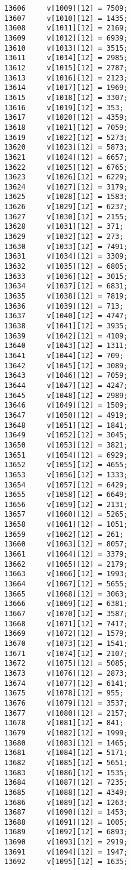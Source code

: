 \begin{Code}
\begin{verbatim}
13606     v[1009][12] = 7509;
13607     v[1010][12] = 1435;
13608     v[1011][12] = 2169;
13609     v[1012][12] = 6939;
13610     v[1013][12] = 3515;
13611     v[1014][12] = 2985;
13612     v[1015][12] = 2787;
13613     v[1016][12] = 2123;
13614     v[1017][12] = 1969;
13615     v[1018][12] = 3307;
13616     v[1019][12] = 353;
13617     v[1020][12] = 4359;
13618     v[1021][12] = 7059;
13619     v[1022][12] = 5273;
13620     v[1023][12] = 5873;
13621     v[1024][12] = 6657;
13622     v[1025][12] = 6765;
13623     v[1026][12] = 6229;
13624     v[1027][12] = 3179;
13625     v[1028][12] = 1583;
13626     v[1029][12] = 6237;
13627     v[1030][12] = 2155;
13628     v[1031][12] = 371;
13629     v[1032][12] = 273;
13630     v[1033][12] = 7491;
13631     v[1034][12] = 3309;
13632     v[1035][12] = 6805;
13633     v[1036][12] = 3015;
13634     v[1037][12] = 6831;
13635     v[1038][12] = 7819;
13636     v[1039][12] = 713;
13637     v[1040][12] = 4747;
13638     v[1041][12] = 3935;
13639     v[1042][12] = 4109;
13640     v[1043][12] = 1311;
13641     v[1044][12] = 709;
13642     v[1045][12] = 3089;
13643     v[1046][12] = 7059;
13644     v[1047][12] = 4247;
13645     v[1048][12] = 2989;
13646     v[1049][12] = 1509;
13647     v[1050][12] = 4919;
13648     v[1051][12] = 1841;
13649     v[1052][12] = 3045;
13650     v[1053][12] = 3821;
13651     v[1054][12] = 6929;
13652     v[1055][12] = 4655;
13653     v[1056][12] = 1333;
13654     v[1057][12] = 6429;
13655     v[1058][12] = 6649;
13656     v[1059][12] = 2131;
13657     v[1060][12] = 5265;
13658     v[1061][12] = 1051;
13659     v[1062][12] = 261;
13660     v[1063][12] = 8057;
13661     v[1064][12] = 3379;
13662     v[1065][12] = 2179;
13663     v[1066][12] = 1993;
13664     v[1067][12] = 5655;
13665     v[1068][12] = 3063;
13666     v[1069][12] = 6381;
13667     v[1070][12] = 3587;
13668     v[1071][12] = 7417;
13669     v[1072][12] = 1579;
13670     v[1073][12] = 1541;
13671     v[1074][12] = 2107;
13672     v[1075][12] = 5085;
13673     v[1076][12] = 2873;
13674     v[1077][12] = 6141;
13675     v[1078][12] = 955;
13676     v[1079][12] = 3537;
13677     v[1080][12] = 2157;
13678     v[1081][12] = 841;
13679     v[1082][12] = 1999;
13680     v[1083][12] = 1465;
13681     v[1084][12] = 5171;
13682     v[1085][12] = 5651;
13683     v[1086][12] = 1535;
13684     v[1087][12] = 7235;
13685     v[1088][12] = 4349;
13686     v[1089][12] = 1263;
13687     v[1090][12] = 1453;
13688     v[1091][12] = 1005;
13689     v[1092][12] = 6893;
13690     v[1093][12] = 2919;
13691     v[1094][12] = 1947;
13692     v[1095][12] = 1635;

\end{verbatim}
\end{Code}
